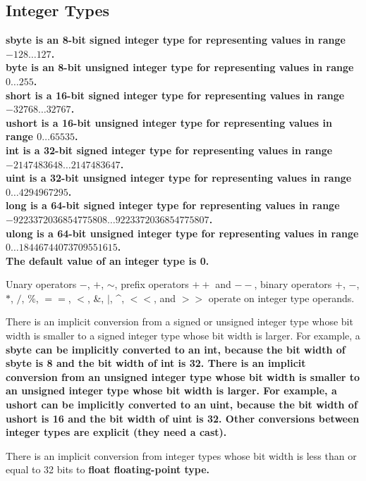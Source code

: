 \documentclass[a4paper,oneside,11pt]{article}
\begin{document}
\subsection{Integer Types}

\bf{sbyte} is an 8-bit signed integer type for representing values in range $-128 \ldots 127$.\\
\bf{byte} is an 8-bit unsigned integer type for representing values in range $0 \ldots 255$.\\
\bf{short} is a 16-bit signed integer type for representing values in range $-32768 \ldots 32767$.\\
\bf{ushort} is a 16-bit unsigned integer type for representing values in range $0 \ldots 65535$.\\
\bf{int} is a 32-bit signed integer type for representing values in range $-2147483648 \ldots 2147483647$.\\
\bf{uint} is a 32-bit unsigned integer type for representing values in range $0 \ldots 4294967295$.\\
\bf{long} is a 64-bit signed integer type for representing values in range\\
$-9223372036854775808 \ldots 9223372036854775807$.\\
\bf{ulong} is a 64-bit unsigned integer type for representing values in range $0 \ldots 18446744073709551615$.\\

The default value of an integer type is 0.

Unary operators $-$, $+$, $\sim$, prefix operators $++$ and $--$,
binary operators $+$, $-$, $*$, $/$, $\%$, $==$, $<$, \&, $|$, \^{}, $<<$, and $>>$ operate on integer type operands.

There is an implicit conversion from a signed or unsigned integer type whose bit width is smaller to a signed integer type whose bit width is larger.
For example, a \bf{sbyte} can be implicitly converted to an \bf{int}, because the bit width of \bf{sbyte} is 8 and the bit width of \bf{int} is 32.
There is an implicit conversion from an unsigned integer type whose bit width is smaller to an unsigned integer type whose bit width is larger.
For example, a \bf{ushort} can be implicitly converted to an \bf{uint}, because the bit width of \bf{ushort} is 16 and the bit width of \bf{uint} is 32.
Other conversions between integer types are explicit (they need a \bf{cast}).

There is an implicit conversion from integer types whose bit width is less than or equal to 32 bits to \bf{float} floating-point type.
\end{document}
